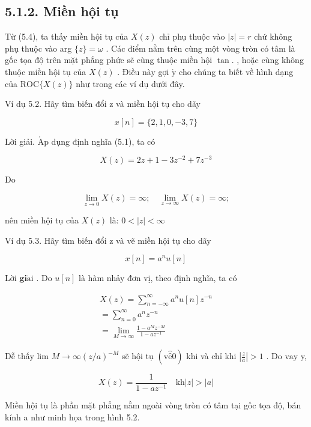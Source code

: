 \documentclass[
  10
]{article}
\begin{document}
\subsection{5.1.2. Miền hội tụ}\label{miux1ec1n-hux1ed9i-tux1ee5}

Từ (5.4), ta thấy miền hội tụ của \(X ( z )\) chỉ phụ thuộc vào
\(| z | = r\) chứ không phụ thuộc vào arg \(\{ z \} = \omega\) . Các
điểm nằm trên cùng một vòng tròn có tâm là gốc tọa độ trên mặt phẳng
phức sẽ cùng thuộc miền hội \(\tan .\) , hoặc cùng không thuộc miền hội
tụ của \(X ( z )\) . Điều này gợi \(\acute { \mathrm { y } }\) cho chúng
ta biết về hình dạng của \(\mathrm { R O C } \{ X ( z ) \}\) như trong
các ví dụ dưới đây.

Ví dụ 5.2. Hãy tìm biến đổi z và miền hội tụ cho dãy

\[
x [ n ] = \{2, 1, 0, - 3, 7 \}
\]

Lời giải. \(\mathrm { { \acute { A } p } }\) dụng định nghĩa (5.1), ta
có

\[
X (z) = 2 z + 1 - 3 z ^ {- 2} + 7 z ^ {- 3}
\]

Do

\[
\lim _ {z \to 0} X (z) = \infty ; \quad \lim _ {z \to \infty} X (z) = \infty ;
\]

nên miền hội tụ của \(X ( z )\) là: \(0 < | z | < \infty\)

Ví dụ 5.3. Hãy tìm biến đổi z và vẽ miền hội tụ cho dãy

\[
x [ n ] = a ^ {n} u [ n ]
\]

Lời \(\mathbf { g i } \mathrm { \dot { a } i }\) . Do \(u [ n ]\) là hàm
nhảy đơn vị, theo định nghĩa, ta có

\[
\begin{array}{l} X (z) = \sum_ {n = - \infty} ^ {\infty} a ^ {n} u [ n ] z ^ {- n} \\ = \sum_ {n = 0} ^ {\infty} a ^ {n} z ^ {- n} \\ = \lim _ {M \to \infty} \frac {1 - a ^ {M} z ^ {- M}}{1 - a z ^ {- 1}} \end{array}
\]

Dễ thấy lim \(M \to \infty  \left( z / a \right) ^ { - M }\) sẽ hội tụ
\(( \mathrm { v } \hat { \hat { \mathrm { e } } } 0 )\) khi và chỉ khi
\(\textstyle | { \frac { z } { a } } | > 1\) . Do \(\mathrm { v a y }\)
y,

\[
X (z) = \frac {1}{1 - a z ^ {- 1}} \quad \mathrm{kh} | z | > | a |\tag{5.5}
\]

Miền hội tụ là phần mặt phẳng nằm ngoài vòng tròn có tâm tại gốc tọa độ,
bán kính a như minh họa trong hình 5.2.
\end{document}

